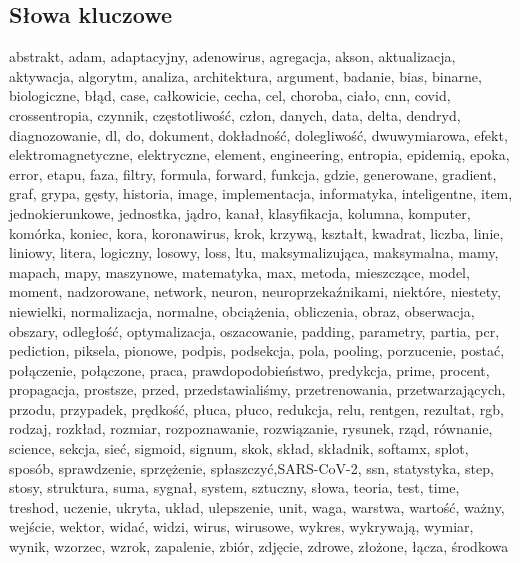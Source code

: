 \documentclass{article}
\begin{document}
\subsection{Słowa kluczowe}
abstrakt, adam, adaptacyjny, adenowirus, agregacja, akson, aktualizacja, aktywacja, algorytm, analiza, architektura, argument, badanie, bias, binarne, biologiczne, błąd, case, całkowicie, cecha, cel, choroba, ciało, cnn, covid, crossentropia, czynnik, częstotliwość, człon, danych, data, delta, dendryd, diagnozowanie, dl, do, dokument, dokładność, dolegliwość, dwuwymiarowa, efekt, elektromagnetyczne, elektryczne, element, engineering, entropia, epidemią, epoka, error, etapu, faza, filtry, formula, forward, funkcja, gdzie, generowane, gradient, graf, grypa, gęsty, historia, image, implementacja, informatyka, inteligentne, item, jednokierunkowe, jednostka, jądro, kanał, klasyfikacja, kolumna, komputer, komórka, koniec, kora, koronawirus, krok, krzywą, kształt, kwadrat, liczba, linie, liniowy, litera, logiczny, losowy, loss, ltu, maksymalizująca, maksymalna, mamy, mapach, mapy, maszynowe, matematyka, max, metoda, mieszczące, model, moment, nadzorowane, network, neuron, neuroprzekaźnikami, niektóre, niestety, niewielki, normalizacja, normalne, obciążenia, obliczenia, obraz, obserwacja, obszary, odległość, optymalizacja, oszacowanie, padding, parametry, partia, pcr, pediction, piksela, pionowe, podpis, podsekcja, pola, pooling, porzucenie, postać, połączenie, połączone, praca, prawdopodobieństwo, predykcja, prime, procent, propagacja, prostsze, przed, przedstawialiśmy, przetrenowania, przetwarzających, przodu, przypadek, prędkość, płuca, płuco, redukcja, relu, rentgen, rezultat, rgb, rodzaj, rozkład, rozmiar, rozpoznawanie, rozwiązanie, rysunek, rząd, równanie, science, sekcja, sieć, sigmoid, signum, skok, skład, składnik, softamx, splot, sposób, sprawdzenie, sprzężenie, spłaszczyć,SARS-CoV-2, ssn, statystyka, step, stosy, struktura, suma, sygnał, system, sztuczny, słowa, teoria, test, time, treshod, uczenie, ukryta, układ, ulepszenie, unit, waga, warstwa, wartość, ważny, wejście, wektor, widać, widzi, wirus, wirusowe, wykres, wykrywają, wymiar, wynik, wzorzec, wzrok, zapalenie, zbiór, zdjęcie, zdrowe, złożone, łącza, środkowa\\

\vspace{0.4cm}
\end{document}
